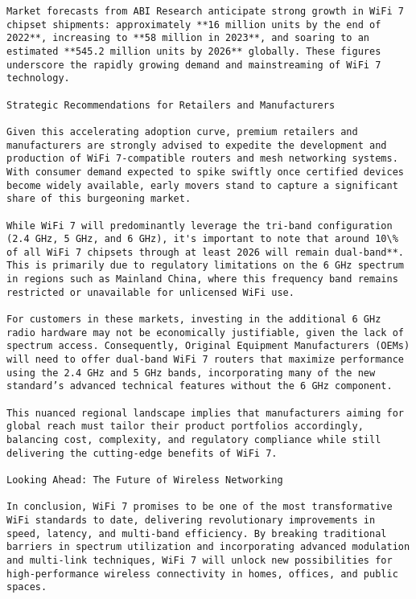 \begin{verbatim}
Market forecasts from ABI Research anticipate strong growth in WiFi 7 chipset shipments: approximately **16 million units by the end of 2022**, increasing to **58 million in 2023**, and soaring to an estimated **545.2 million units by 2026** globally. These figures underscore the rapidly growing demand and mainstreaming of WiFi 7 technology.

Strategic Recommendations for Retailers and Manufacturers

Given this accelerating adoption curve, premium retailers and manufacturers are strongly advised to expedite the development and production of WiFi 7-compatible routers and mesh networking systems. With consumer demand expected to spike swiftly once certified devices become widely available, early movers stand to capture a significant share of this burgeoning market.

While WiFi 7 will predominantly leverage the tri-band configuration (2.4 GHz, 5 GHz, and 6 GHz), it's important to note that around 10\% of all WiFi 7 chipsets through at least 2026 will remain dual-band**. This is primarily due to regulatory limitations on the 6 GHz spectrum in regions such as Mainland China, where this frequency band remains restricted or unavailable for unlicensed WiFi use.

For customers in these markets, investing in the additional 6 GHz radio hardware may not be economically justifiable, given the lack of spectrum access. Consequently, Original Equipment Manufacturers (OEMs) will need to offer dual-band WiFi 7 routers that maximize performance using the 2.4 GHz and 5 GHz bands, incorporating many of the new standard’s advanced technical features without the 6 GHz component.

This nuanced regional landscape implies that manufacturers aiming for global reach must tailor their product portfolios accordingly, balancing cost, complexity, and regulatory compliance while still delivering the cutting-edge benefits of WiFi 7.

Looking Ahead: The Future of Wireless Networking

In conclusion, WiFi 7 promises to be one of the most transformative WiFi standards to date, delivering revolutionary improvements in speed, latency, and multi-band efficiency. By breaking traditional barriers in spectrum utilization and incorporating advanced modulation and multi-link techniques, WiFi 7 will unlock new possibilities for high-performance wireless connectivity in homes, offices, and public spaces.


\end{verbatim}
